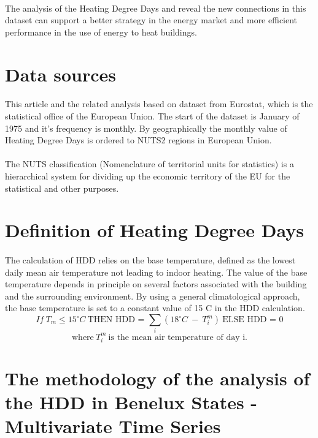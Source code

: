 \documentclass{article}
\begin{document}
\paragraph{}The analysis of the Heating Degree Days and reveal the new connections in this dataset can support a better strategy in the energy market and more efficient performance in the use of energy to heat buildings. 


\section*{Data sources}

\paragraph{}This article and the related analysis based on dataset from Eurostat, which is the statistical office of the European Union. The start of the dataset is January of 1975 and it's frequency is monthly. By geographically the monthly value of Heating Degree Days is ordered to NUTS2 regions in European Union.
\paragraph{}The NUTS classification (Nomenclature of territorial units for statistics) is a hierarchical system for dividing up the economic territory of the EU for 
the statistical and other purposes.  

\section*{Definition of Heating Degree Days}

\paragraph{}The calculation of HDD relies on the base temperature, defined as the lowest daily mean air temperature not leading to indoor heating. The value of the base temperature depends in principle on several factors associated with the building and the surrounding environment. By using a general climatological approach, the base temperature is set to a constant value of 15 \textdegree{}C in the HDD calculation. 
\[If\ T_{m}\leq 15 ^\circ C \ \textrm{THEN HDD = } \sum_{i}(18^\circ C\ -\ T_i^m)\ \textrm{ELSE HDD = 0}\]
 \[\textrm{where}\ T_i^m\ \textrm{is the mean air temperature of day i.}\]

\section*{The methodology of the analysis of the HDD in Benelux States - Multivariate Time Series}
\end{document}
